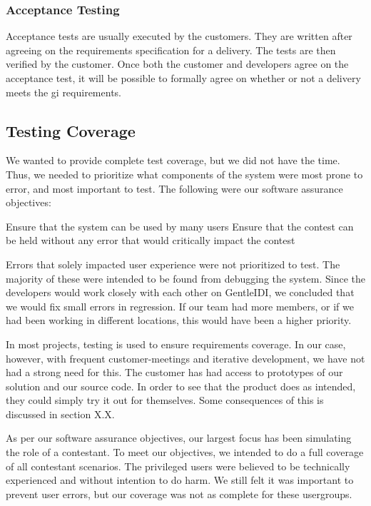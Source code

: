 \subsubsection{Acceptance Testing}
Acceptance tests are usually executed by the customers. They are written
after agreeing on the requirements specification for a delivery. The
tests are then verified by the customer. Once both the customer and
developers agree on the acceptance test, it will be possible to
formally agree on whether or not a delivery meets the gi\ven
requirements.

\subsection{Testing Coverage}
We wanted to provide complete test coverage, but we did not have the
time. Thus, we needed to prioritize what components of the system were
most prone to error, and most important to test. The following were our
software assurance objectives:
\liststyleLSii
\begin{itemize}
Ensure that the system can be used by many users
Ensure that the contest can be held without any error that would
critically impact the contest
\end{itemize}

Errors that solely impacted user experience were not prioritized to
test. The majority of these were intended to be found from debugging
the system. Since the developers would work closely with each other on
GentleIDI, we concluded that we would fix small errors in regression.
If our team had more members, or if we had been working in different
locations, this would have been a higher priority.

In most projects, testing is used to ensure requirements coverage. In
our case, however, with frequent customer-meetings and iterative
development, we have not had a strong need for this. The customer has
had access to prototypes of our solution and our source code. In order
to see that the product does as intended, they could simply try it out
for themselves. Some consequences of this is discussed in section X.X.

As per our software assurance objectives, our largest focus has been
simulating the role of a contestant. To meet our objectives, we
intended to do a full coverage of all contestant scenarios. The
privileged users were believed to be technically experienced and
without intention to do harm. We still felt it was important to prevent
user errors, but our coverage was not as complete for these
usergroups.

